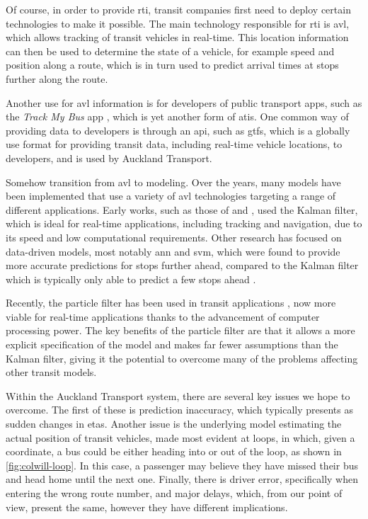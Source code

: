 \documentclass[12pt,a4paper]{article}
\newcommand{\kf}{Kalman filter}
\newcommand{\pf}{particle filter}
\begin{document}
Of course, in order to provide \gls{rti}, 
transit companies first need to deploy certain technologies to make it possible.
The main technology responsible for \gls{rti} is \gls{avl},
which allows tracking of transit vehicles in real-time.
This location information can then be used to determine the state of a vehicle,
for example speed and position along a route,
which is in turn used to predict arrival times at stops further along the route.


Another use for \gls{avl} information is for developers of public transport apps,
such as the \emph{Track My Bus} app \citep{trackmybus},
which is yet another form of \gls{atis}.
One common way of providing data to developers is through an \gls{api},
such as \gls{gtfs}, which is a globally use format for providing transit data,
including real-time vehicle locations, to developers, 
and is used by Auckland Transport.


Somehow transition from \gls{avl} to modeling.
Over the years, many models have been implemented that use a variety of \gls{avl} technologies
targeting a range of different applications.
Early works, such as those of \cite{wall-dailey:1999} and \cite{dailey:2001},
used the \kf{}, which is ideal for real-time applications, including tracking and navigation,
due to its speed and low computational requirements.
Other research has focused on data-driven models,
most notably \gls{ann} and \gls{svm}, 
which were found to provide more accurate predictions for stops further ahead,
compared to the \kf{} which is typically only able to predict a few stops ahead
\citep{cn}.


Recently, the \pf{} has been used in transit applications \citep{cn},
now more viable for real-time applications thanks to the advancement of 
computer processing power.
The key benefits of the \pf{} are that it allows a more explicit specification of the model
and makes far fewer assumptions than the \kf{},
giving it the potential to overcome many of the problems affecting other transit models.


Within the Auckland Transport system, there are several key issues we hope to overcome.
The first of these is prediction inaccuracy, 
which typically presents as sudden changes in \glspl{eta}.
Another issue is the underlying model estimating the actual position of transit vehicles,
made most evident at loops, in which, given a coordinate, 
a bus could be either heading into or out of the loop,
as shown in \cref{fig:colwill-loop}.
In this case, a passenger may believe they have missed their bus and head home until the next one.
Finally, there is driver error, specifically when entering the wrong route number,
and major delays, which,
from our point of view, present the same,
however they have different implications.
\end{document}
